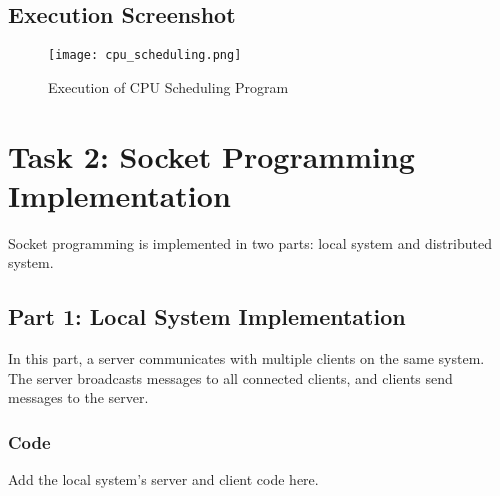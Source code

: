 \documentclass[a4paper,12pt]{article}
\begin{document}
\begin{lstlisting}[caption={CPU Scheduling Algorithms Implementation}, label={lst:cpu-scheduling}]
\end{lstlisting}

\subsection{Execution Screenshot}
\begin{figure}[h!]
    \centering
    \texttt{[image: cpu\_scheduling.png]}
    \caption{Execution of CPU Scheduling Program}
    \label{fig:cpu-scheduling}
\end{figure}

\newpage

\section{Task 2: Socket Programming Implementation}
Socket programming is implemented in two parts: local system and distributed system.

\subsection{Part 1: Local System Implementation}
In this part, a server communicates with multiple clients on the same system. The server broadcasts messages to all connected clients, and clients send messages to the server.

\subsubsection{Code}
Add the local system's server and client code here.
\end{document}
